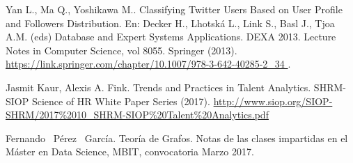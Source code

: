 \begin{thebibliography}{3}
 Yan L., Ma Q., Yoshikawa M.. Classifying Twitter Users Based on User Profile and Followers Distribution. En: Decker H., Lhotská L., Link S., Basl J., Tjoa A.M. (eds) Database and Expert Systems Applications. DEXA 2013. Lecture Notes in Computer Science, vol 8055. Springer (2013).
\url{https://link.springer.com/chapter/10.1007/978-3-642-40285-2_34 }.

 Jasmit Kaur, Alexis A. Fink. Trends and Practices in Talent
Analytics. SHRM-SIOP Science of HR White Paper Series (2017).
\url{http://www.siop.org/SIOP-SHRM/2017%2010_SHRM-SIOP%20Talent%20Analytics.pdf }

 Fernando  Pérez  García. Teoría de Grafos. Notas de las clases
impartidas en el Máster en Data Science, MBIT, convocatoria Marzo 2017.

\end{thebibliography}